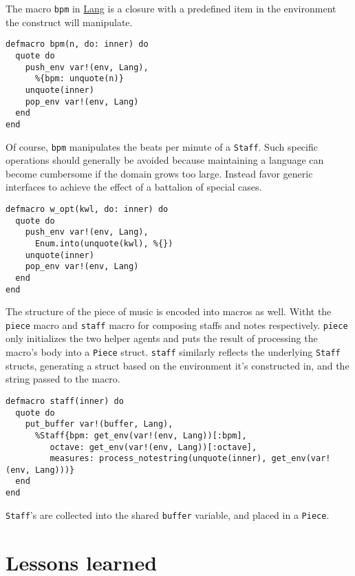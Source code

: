 \documentclass[11pt]{article}
\begin{document}
The macro \texttt{bpm} in \href{lib/lang.ex}{Lang} is a closure with a predefined item in the
environment the construct will manipulate.
\begin{verbatim}
defmacro bpm(n, do: inner) do
  quote do
    push_env var!(env, Lang),
      %{bpm: unquote(n)}
    unquote(inner)
    pop_env var!(env, Lang)
  end
end
\end{verbatim}
Of course, \texttt{bpm} manipulates the beats per minute of a
\texttt{Staff}. Such specific operations should generally be avoided
because maintaining a language can become cumbersome if the domain
grows too large. Instead favor generic interfaces to achieve the
effect of a battalion of special cases.
\begin{verbatim}
defmacro w_opt(kwl, do: inner) do
  quote do
    push_env var!(env, Lang),
      Enum.into(unquote(kwl), %{})
    unquote(inner)
    pop_env var!(env, Lang)
  end
end
\end{verbatim}
The structure of the piece of music is encoded into macros as
well. Witht the \texttt{piece} macro and \texttt{staff} macro for composing
staffs and notes respectively. \texttt{piece} only initializes the two
helper agents and puts the result of processing the macro's body
into a \texttt{Piece} struct. \texttt{staff} similarly reflects the underlying
\texttt{Staff} structs, generating a struct based on the environment it's
constructed in, and the string passed to the macro.
\begin{verbatim}
defmacro staff(inner) do
  quote do
    put_buffer var!(buffer, Lang),
      %Staff{bpm: get_env(var!(env, Lang))[:bpm],
	     octave: get_env(var!(env, Lang))[:octave],
	     measures: process_notestring(unquote(inner), get_env(var!(env, Lang)))}
  end
end
\end{verbatim}
\texttt{Staff}'s are collected into the shared \texttt{buffer} variable, and
placed in a \texttt{Piece}.
\section{Lessons learned}
\label{sec-4}
\end{document}
